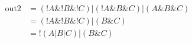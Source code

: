 \documentclass{article}
\theoremstyle{remark}
\theoremstyle{definition}
\begin{document}
\begin{enumerate}
        $$
        \begin{aligned}
            \text{out2} &= \left( !A \& !B \& !C \right) | \left( !A \& B \& C \right) | \left( A \& B \& C \right) \\
            &= \left( !A \& !B \& !C \right) | \left( B \& C \right) \\
            &= !\left( A|B|C \right) | \left( B \& C \right)
        \end{aligned}
        $$

    \end{enumerate}
\end{document}
